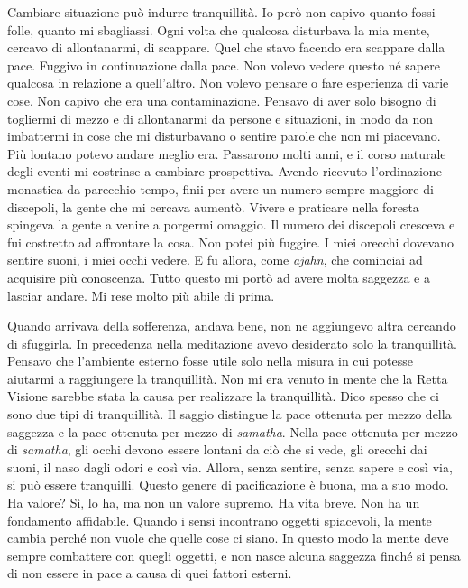 Cambiare situazione può indurre tranquillità. Io però non capivo quanto
fossi folle, quanto mi sbagliassi. Ogni volta che qualcosa disturbava la
mia mente, cercavo di allontanarmi, di scappare. Quel che stavo facendo
era scappare dalla pace. Fuggivo in continuazione dalla pace. Non volevo
vedere questo né sapere qualcosa in relazione a quell'altro. Non volevo
pensare o fare esperienza di varie cose. Non capivo che era una
contaminazione. Pensavo di aver solo bisogno di togliermi di mezzo e di
allontanarmi da persone e situazioni, in modo da non imbattermi in cose
che mi disturbavano o sentire parole che non mi piacevano. Più lontano
potevo andare meglio era. Passarono molti anni, e il corso naturale
degli eventi mi costrinse a cambiare prospettiva. Avendo ricevuto
l'ordinazione monastica da parecchio tempo, finii per avere un numero
sempre maggiore di discepoli, la gente che mi cercava aumentò. Vivere e
praticare nella foresta spingeva la gente a venire a porgermi omaggio.
Il numero dei discepoli cresceva e fui costretto ad affrontare la cosa.
Non potei più fuggire. I miei orecchi dovevano sentire suoni, i miei
occhi vedere. E fu allora, come \emph{ajahn}, che cominciai ad acquisire
più conoscenza. Tutto questo mi portò ad avere molta saggezza e a
lasciar andare. Mi rese molto più abile di prima.

Quando arrivava della sofferenza, andava bene, non ne aggiungevo altra
cercando di sfuggirla. In precedenza nella meditazione avevo desiderato
solo la tranquillità. Pensavo che l'ambiente esterno fosse utile solo
nella misura in cui potesse aiutarmi a raggiungere la tranquillità. Non
mi era venuto in mente che la Retta Visione sarebbe stata la causa per
realizzare la tranquillità. Dico spesso che ci sono due tipi di
tranquillità. Il saggio distingue la pace ottenuta per mezzo della
saggezza e la pace ottenuta per mezzo di \emph{samatha}. Nella pace
ottenuta per mezzo di \emph{samatha}, gli occhi devono essere lontani da
ciò che si vede, gli orecchi dai suoni, il naso dagli odori e così via.
Allora, senza sentire, senza sapere e così via, si può essere
tranquilli. Questo genere di pacificazione è buona, ma a suo modo. Ha
valore? Sì, lo ha, ma non un valore supremo. Ha vita breve. Non ha un
fondamento affidabile. Quando i sensi incontrano oggetti spiacevoli, la
mente cambia perché non vuole che quelle cose ci siano. In questo modo
la mente deve sempre combattere con quegli oggetti, e non nasce alcuna
saggezza finché si pensa di non essere in pace a causa di quei fattori
esterni.

